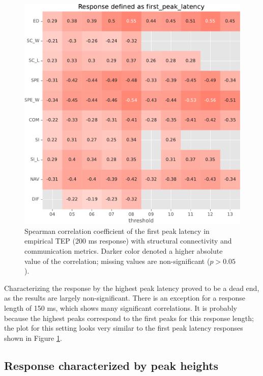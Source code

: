 \begin{figure}
    \centering
    \includegraphics[width=\textwidth]{images/nootebook_generated/tmseeg_results/empirical/200/not_over_threshold_nan/Response defined as first_peak_latency.pdf}
    \caption[TEPs first peak latency (200 ms) correlations]{Spearman correlation coefficient of the first peak latency in empirical TEP (200 ms response) with structural connectivity and communication metrics. Darker color denoted a higher absolute value of the correlation; missing values are non-significant ($p>0.05$).}
    \label{fig:tms_first_time_200}
\end{figure}

Characterizing the response by the highest peak latency proved to be a dead end, as the results are largely non-significant. There is an exception for a response length of 150 ms, which shows many significant correlations. It is probably because the highest peaks correspond to the first peaks for this response length; the plot for this setting looks very similar to the first peak latency responses shown in Figure \ref{fig:tms_first_time_200}. 

\subsection{Response characterized by peak heights}

